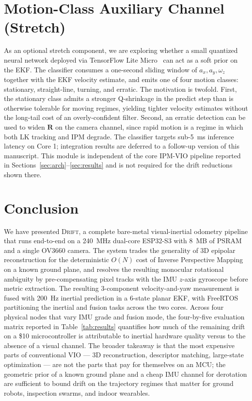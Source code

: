 \documentclass[conference]{IEEEtran}
\begin{document}
\section{Motion-Class Auxiliary Channel (Stretch)}
\label{sec:tinyml}

As an optional stretch component, we are exploring whether a small
quantized neural network deployed via TensorFlow Lite
Micro~\cite{david2021tflitemicro,warden2019tinyml} can act as a
soft prior on the EKF.  The classifier consumes a one-second sliding
window of ${a_x, a_y, \omega_z}$ together with the EKF velocity
estimate, and emits one of four motion classes: stationary,
straight-line, turning, and erratic.  The motivation is twofold.
First, the stationary class admits a stronger Q-shrinkage in the
predict step than is otherwise tolerable for moving regimes,
yielding tighter velocity estimates without the long-tail cost of an
overly-confident filter.  Second, an erratic detection can be used
to widen $\mathbf{R}$ on the camera channel, since rapid motion is
a regime in which both LK tracking and IPM degrade.  The
classifier targets sub-5~ms inference latency on Core 1; integration
results are deferred to a follow-up version of this manuscript.
This module is independent of the core IPM-VIO pipeline reported
in Sections~\ref{sec:arch}--\ref{sec:results} and is not required
for the drift reductions shown there.

\section{Conclusion}
\label{sec:conclusion}

We have presented \textsc{Drift}, a complete bare-metal
visual-inertial odometry pipeline that runs end-to-end on a 240~MHz
dual-core ESP32-S3 with 8~MB of PSRAM and a single OV3660 camera.
The system trades the generality of 3D epipolar reconstruction for
the deterministic $O(N)$ cost of Inverse Perspective Mapping on a
known ground plane, and resolves the resulting monocular rotational
ambiguity by pre-compensating pixel tracks with the IMU $z$-axis
gyroscope before metric extraction.  The resulting 3-component
velocity-and-yaw measurement is fused with 200~Hz inertial prediction
in a 6-state planar EKF, with FreeRTOS partitioning the inertial and
fusion tasks across the two cores.  Across four physical nodes that
vary IMU grade and fusion mode, the four-by-five evaluation matrix
reported in Table~\ref{tab:results} quantifies how much of the
remaining drift on a \$10 microcontroller is attributable to inertial
hardware quality versus to the absence of a visual channel.  The
broader takeaway is that the most expensive parts of conventional
VIO --- 3D reconstruction, descriptor matching, large-state
optimization --- are not the parts that pay for themselves on an
MCU; the geometric prior of a known ground plane and a cheap IMU
channel for derotation are sufficient to bound drift on the
trajectory regimes that matter for ground robots, inspection
swarms, and indoor wearables.
\end{document}
